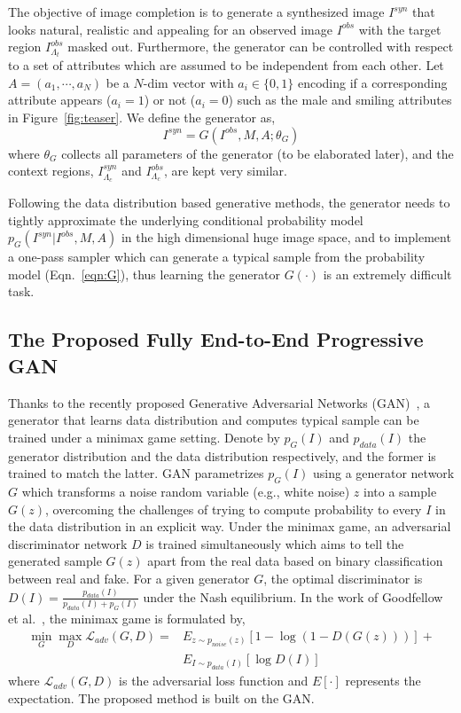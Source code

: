 \documentclass[acmtog,timestamp]{acmart}
\begin{document}
The objective of image completion is to generate a synthesized image $I^{syn}$ that looks natural, realistic and appealing for an observed image $I^{obs}$ with the target region $I^{obs}_{\Lambda_t}$ masked out. Furthermore, the generator can be controlled  with respect to a set of attributes which are assumed to be independent from each other. Let $A=(a_1, \cdots, a_N)$ be a $N$-dim vector with $a_i\in\{0,1\}$ encoding if a corresponding attribute appears ($a_i=1$) or not ($a_i=0$) such as the male and smiling attributes in Figure~\ref{fig:teaser}.  We define the generator as,  
\begin{equation}
I^{syn} = G(I^{obs}, M, A; \theta_G)\label{eqn:G}
\end{equation}
where $\theta_G$ collects all parameters of the generator (to be elaborated later), and the context regions, $I^{syn}_{\Lambda_c}$ and $I^{obs}_{\Lambda_c}$, are kept very similar. 

Following the data distribution based generative methods, the generator needs to tightly approximate the underlying conditional probability model $p_G(I^{syn}|I^{obs}, M, A)$ in the high dimensional huge image space, and to implement a one-pass sampler which can generate a typical sample from the probability model (Eqn.~\ref{eqn:G}), thus learning the generator $G(\cdot)$ is an extremely difficult task. 

\subsection{The Proposed Fully End-to-End Progressive GAN}
Thanks to the recently proposed Generative Adversarial Networks (GAN)~\cite{goodfellow2014generative}, a generator that learns data distribution and computes typical sample can be trained under a minimax game setting. Denote by $p_G(I)$ and $p_{data}(I)$ the generator distribution and the data distribution respectively, and the former is trained to match the latter. GAN parametrizes $p_G(I)$ using a generator network $G$ which transforms a noise random variable (e.g., white noise) $z$ into a sample $G(z)$, overcoming the challenges of trying to compute probability to every $I$ in the data distribution in an explicit way. Under the minimax game, an adversarial discriminator network $D$ is trained simultaneously which aims to tell the generated sample $G(z)$ apart from the real data based on binary classification between real and fake. For a given generator $G$, the optimal discriminator is $D(I)=\frac{p_{data}(I)}{p_{data}(I)+p_{G}(I)}$ under the Nash equilibrium. In the work of Goodfellow et al.~\cite{goodfellow2014generative}, the minimax game is formulated by, 
\begin{align}
\nonumber \min_{G} \max_{D} \mathcal{L}_{adv}(G,D) = & E_{z\sim p_{noise}(z)}[1-\log{(1-D(G(z)))}] + \\
& E_{I\sim p_{data}(I)}[\log{D(I)}] \label{eqn:GAN}
\end{align}    
where $\mathcal{L}_{adv}(G,D)$ is the adversarial loss function and $E[\cdot]$ represents the expectation. The proposed method is built on the GAN.
\end{document}
